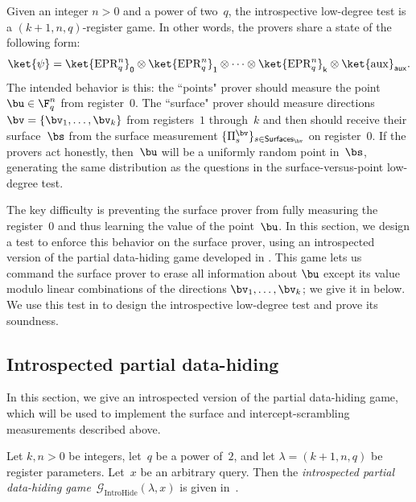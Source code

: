 \documentclass[11pt]{article}
\newcommand{\game}{\mathscr{G}}
\newcommand{\reg}[1]{{\mathsf{#1}}}
\newcommand{\surfaces}[1]{\mathsf{Surfaces}_{#1}}
\begin{document}
Given an integer $n > 0$ and a power of two~$q$,
the introspective low-degree test is a $(k+1, n, q)$-register game.
In other words, the provers share a state of the following form:
\begin{equation*}
\ket{\psi}
=
\ket{\mathrm{EPR}_q^n}_{\reg{0}}
\otimes \ket{\mathrm{EPR}_q^n}_{\reg{1}}
\otimes
\cdots
\otimes
\ket{\mathrm{EPR}_q^n}_{\reg{k}}
\otimes
\ket{\mathrm{aux}}_{\reg{aux}}.
\end{equation*}
The intended behavior is this: the ``points" prover should measure the point $\bu \in \F_q^n$ from register~$0$.
The ``surface"  prover should measure directions $\bv = \{\bv_1, \ldots, \bv_k\}$ from registers~$1$ through~$k$
and then should receive their surface~$\bs$ from the surface measurement $\{\Pi^{\bv}_s\}_{s\in \surfaces{\bv}}$ on register~$0$.
If the provers act honestly, then~$\bu$ will be a uniformly random point in~$\bs$,
generating the same distribution as the questions in the surface-versus-point low-degree test.

The key difficulty is preventing the surface prover from fully
measuring the register~$0$ and thus learning the value of the point~$\bu$.
In this section, we design a test to enforce this behavior on the
surface prover, using an introspected version of the partial data-hiding game developed in .
This game lets us command the
surface prover to erase all information about $\bu$ except its value
modulo linear combinations of the directions $\bv_1, \dots, \bv_k$;
we give it in  below.
We use this test in   to design the introspective
low-degree test and prove its soundness.


\subsection{Introspected partial data-hiding}
\label{sec:ihide}

In this section, we give an introspected version of the partial
data-hiding game, which will be used to implement the surface and
intercept-scrambling measurements described above.

\begin{definition}
Let $k, n >0$ be integers, let~$q$ be a power of~$2$,
and let $\lambda = (k+1, n, q)$ be register parameters.
Let~$x$ be an arbitrary query.
Then the \emph{introspected partial data-hiding game}~$\game_{\mathrm{IntroHide}}(\lambda, x)$ is given in~.
\end{definition}
\end{document}
